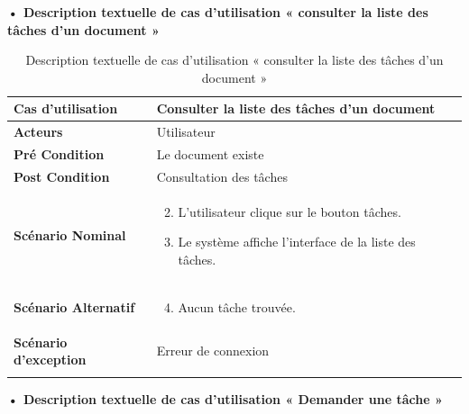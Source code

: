 \textbf{•	Description textuelle de cas d'utilisation « consulter la liste des tâches d'un document »}

\begin{longtable}{|p{5cm}|p{10cm}|}
\hline
\textbf{Cas d'utilisation}&Consulter la liste des tâches d'un document\\
\hline
\textbf{Acteurs}&Utilisateur\\
\hline
\textbf{Pré Condition}&Le document existe\\
\hline
\textbf{Post Condition}&Consultation des tâches\\
\hline
\textbf{Scénario Nominal}&
\vspace{-\baselineskip}
\begin{enumerate}
    \setcounter{enumi}{1}
    \item L'utilisateur clique sur le bouton tâches.
    \item Le système affiche l'interface de la liste des tâches.
    
\end{enumerate}\\
\hline
\textbf{Scénario Alternatif}&
\vspace{-\baselineskip}
\begin{enumerate}
    \setcounter{enumi}{3}
    \item Aucun tâche trouvée.
\end{enumerate}\\
\hline
\textbf{Scénario d'exception}&Erreur de connexion\\
\hline
\caption{Description textuelle de cas d'utilisation « consulter la liste des tâches d'un document »}
\label{tab:DescriptionTextuelleDeCasDUtilisationConsulterLaListeDesTachesDUnDocument}
\end{longtable}



\textbf{•	Description textuelle de cas d'utilisation « Demander une tâche »}

